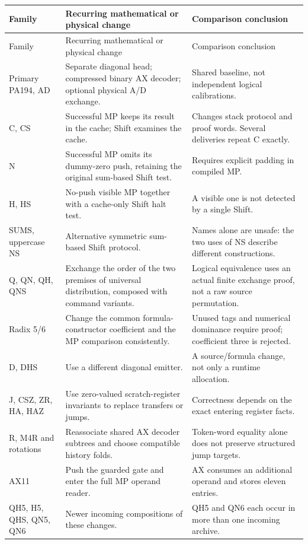 \documentclass[11pt]{article}
\begin{document}
\begin{longtable}{@{}p{.19\linewidth}p{.43\linewidth}p{.30\linewidth}@{}}
\toprule Family & Recurring mathematical or physical change & Comparison conclusion\\\midrule
\endfirsthead
\toprule Family & Recurring mathematical or physical change & Comparison conclusion\\\midrule
\endhead
Primary PA194, AD & Separate diagonal head; compressed binary AX decoder; optional physical A/D exchange. & Shared baseline, not independent logical calibrations.\\
C, CS & Successful MP keeps its result in the cache; Shift examines the cache. & Changes stack protocol and proof words. Several deliveries repeat C exactly.\\
N & Successful MP omits its dummy-zero push, retaining the original sum-based Shift test. & Requires explicit padding in compiled MP.\\
H, HS & No-push visible MP together with a cache-only Shift halt test. & A visible one is not detected by a single Shift.\\
SUMS, uppercase NS & Alternative symmetric sum-based Shift protocol. & Names alone are unsafe: the two uses of NS describe different constructions.\\
Q, QN, QH, QNS & Exchange the order of the two premises of universal distribution, composed with command variants. & Logical equivalence uses an actual finite exchange proof, not a raw source permutation.\\
Radix 5/6 & Change the common formula-constructor coefficient and the MP comparison consistently. & Unused tags and numerical dominance require proof; coefficient three is rejected.\\
D, DHS & Use a different diagonal emitter. & A source/formula change, not only a runtime allocation.\\
J, CSZ, ZR, HA, HAZ & Use zero-valued scratch-register invariants to replace transfers or jumps. & Correctness depends on the exact entering register facts.\\
R, M4R and rotations & Reassociate shared AX decoder subtrees and choose compatible history folds. & Token-word equality alone does not preserve structured jump targets.\\
AX11 & Push the guarded gate and enter the full MP operand reader. & AX consumes an additional operand and stores eleven entries.\\
QH5, H5, QHS, QN5, QN6 & Newer incoming compositions of these changes. & QH5 and QN6 each occur in more than one incoming archive.\\
\bottomrule
\end{longtable}
\end{document}
